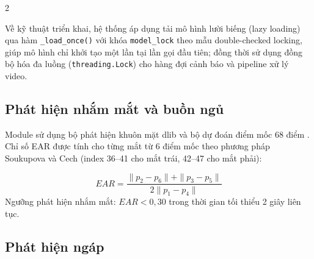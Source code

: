 \documentclass[10pt]{article}
\begin{document}
\begin{multicols}{2}
\begin{minipage}{\columnwidth}
{%
}
\label{fig:architecture}
\end{minipage}
\vspace{4pt}

\begin{sloppypar}
Về kỹ thuật triển khai, hệ thống áp dụng tải mô hình lười biếng (lazy loading) qua hàm {\tt \_load\_once()} với khóa {\tt model\_lock} theo mẫu \mbox{double-checked} locking, giúp mô hình chỉ khởi tạo một lần tại lần gọi đầu tiên; đồng thời sử dụng đồng bộ hóa đa luồng ({\tt threading.Lock}) cho hàng đợi cảnh báo và \mbox{pipeline} xử lý video.
\end{sloppypar}

\subsection{Phát hiện nhắm mắt và buồn ngủ}

Module sử dụng bộ phát hiện khuôn mặt dlib và bộ dự đoán điểm mốc 68 điểm \cite{king2009}. Chỉ số EAR được tính cho từng mắt từ 6 điểm mốc theo phương pháp Soukupova và Cech \cite{soukupova2016} (index 36--41 cho mắt trái, 42--47 cho mắt phải):

\begin{equation}
EAR = \frac{\|p_2 - p_6\| + \|p_3 - p_5\|}{2\|p_1 - p_4\|}
\label{eq:ear}
\end{equation}
Ngưỡng phát hiện nhắm mắt: $EAR < 0{,}30$ trong thời gian tối thiểu 2 giây liên tục.

\subsection{Phát hiện ngáp}


\end{multicols}
\end{document}
